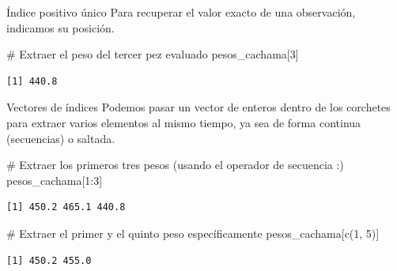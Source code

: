 \documentclass[
  ignorenonframetext,
  aspectratio=169,
  spanish,
]{beamer}
\newenvironment{Shaded}{\begin{snugshade}}{\end{snugshade}}
\newcommand{\CommentTok}[1]{\textcolor[rgb]{0.37,0.37,0.37}{#1}}
\newcommand{\DecValTok}[1]{\textcolor[rgb]{0.68,0.00,0.00}{#1}}
\newcommand{\FunctionTok}[1]{\textcolor[rgb]{0.28,0.35,0.67}{#1}}
\newcommand{\NormalTok}[1]{\textcolor[rgb]{0.00,0.23,0.31}{#1}}
\newcommand{\SpecialCharTok}[1]{\textcolor[rgb]{0.37,0.37,0.37}{#1}}
\begin{document}
\begin{frame}[fragile]{Índice positivo único}
\label{uxedndice-positivo-uxfanico}
Para recuperar el valor exacto de una observación, indicamos su
posición.

\begin{Shaded}
\begin{Highlighting}[]
\CommentTok{\# Extraer el peso del tercer pez evaluado}
\NormalTok{pesos\_cachama[}\DecValTok{3}\NormalTok{] }
\end{Highlighting}
\end{Shaded}

\begin{verbatim}
[1] 440.8
\end{verbatim}
\end{frame}

\begin{frame}[fragile]{Vectores de índices}
\label{vectores-de-uxedndices}
Podemos pasar un vector de enteros dentro de los corchetes para extraer
varios elementos al mismo tiempo, ya sea de forma continua (secuencias)
o saltada.

\begin{Shaded}
\begin{Highlighting}[]
\CommentTok{\# Extraer los primeros tres pesos (usando el operador de secuencia :)}
\NormalTok{pesos\_cachama[}\DecValTok{1}\SpecialCharTok{:}\DecValTok{3}\NormalTok{]}
\end{Highlighting}
\end{Shaded}

\begin{verbatim}
[1] 450.2 465.1 440.8
\end{verbatim}

\begin{Shaded}
\begin{Highlighting}[]
\CommentTok{\# Extraer el primer y el quinto peso específicamente}
\NormalTok{pesos\_cachama[}\FunctionTok{c}\NormalTok{(}\DecValTok{1}\NormalTok{, }\DecValTok{5}\NormalTok{)]}
\end{Highlighting}
\end{Shaded}

\begin{verbatim}
[1] 450.2 455.0
\end{verbatim}
\end{frame}
\end{document}
